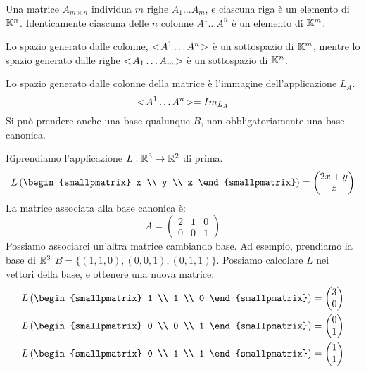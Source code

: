 Una matrice $A_{m \times n}$ individua $m$ righe $A_1 \dots A_m$, e ciascuna riga \`e un elemento di $\mathbb{K}^n$. Identicamente ciascuna delle $n$ colonne $A^1 \dots A^n$ \`e un elemento di $\mathbb{K}^m$.

Lo spazio generato dalle colonne, $<\!{A^1 \dots A^n}\!>$ \`e un sottospazio di $\mathbb{K}^m$, mentre lo spazio generato dalle righe $<\!{A_1 \dots A_m}\!>$ \`e un sottospazio di $\mathbb{K}^n$.

Lo spazio generato dalle colonne della matrice \`e l'immagine dell'applicazione $L_A$.
\[
<\!{A^1 \dots A^n}\!> = Im_{L_A}
\]
Si pu\`o prendere anche una base qualunque $B$, non obbligatoriamente una base canonica.

Riprendiamo l'applicazione $L : \mathbb{R}^3 \to \mathbb{R}^2$ di prima.
\[
L \left(
\begin{smallpmatrix}
x \\ y \\ z
\end{smallpmatrix}
\right) = 
\begin{pmatrix}
2x+y \\ z
\end{pmatrix}
\]
La matrice associata alla base canonica \`e:
\[
A = 
\begin{pmatrix}
2 & 1 & 0 \\
0 & 0 & 1
\end{pmatrix}
\]
Possiamo associarci un'altra matrice cambiando base. Ad esempio, prendiamo la base di $\mathbb{R}^3$ $B = \{ (1,1,0), (0,0,1), (0,1,1) \}$. Possiamo calcolare $L$ nei vettori della base, e ottenere una nuova matrice:
\begin{align*}
L \left(
\begin{smallpmatrix}
1 \\ 1 \\ 0
\end{smallpmatrix}
\right) = 
\begin{pmatrix}
3 \\ 0
\end{pmatrix} \\
L \left(
\begin{smallpmatrix}
0 \\ 0 \\ 1
\end{smallpmatrix}
\right) = 
\begin{pmatrix}
0 \\ 1
\end{pmatrix} \\
L \left(
\begin{smallpmatrix}
0 \\ 1 \\ 1
\end{smallpmatrix}
\right) = 
\begin{pmatrix}
1 \\ 1
\end{pmatrix}
\end{align*}
